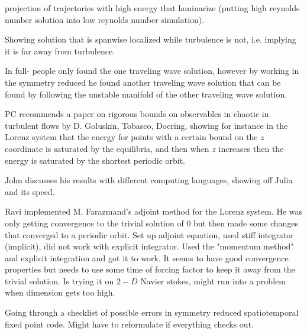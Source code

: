 \begin{description}
{\begin{description}
{\Statesp} projection of trajectories with high energy that laminarize
(putting high reynolds number solution into low reynolds number simulation).

Showing solution that is spanwise localized while turbulence is not,
i.e. implying it is far away from turbulence.

In full-{\statesp} people only found the one traveling wave solution,
however by working in the symmetry reduced {\statesp} he found another
traveling wave solution that can be found by following the unstable manifold of the other traveling wave solution.

PC recommends a paper on rigorous bounds on observables in chaotic in
turbulent flows by D. Goluskin, Tobasco, Doering, showing for instance
in the Lorenz system that the energy for points with a certain bound on the $z$ coordinate is saturated by the equilibria, and then when $z$ increases then the energy is saturated by the shortest periodic orbit.

John discusses his results with different computing languages, showing off Julia and its speed.

Ravi implemented M. Farazmand's adjoint method for the Lorenz system. He was only getting convergence to the trivial solution of $0$ but then made some changes that converged to a periodic orbit. Set up adjoint
equation, used stiff integrator (implicit), did not work with explicit
integrator. Used the "momentum method" and explicit integration and got
it to work. It seems to have good convergence properties but needs to use some time of forcing factor to keep it away from the trivial solution. Is trying it on $2-D$ Navier stokes, might run into a problem
when {\statesp} dimension gets too high.

\item[debugging]
Going through a checklist of possible errors in symmetry reduced spatiotemporal fixed point code. Might have to reformulate if everything checks out.
\end{description}
}

\end{description}
